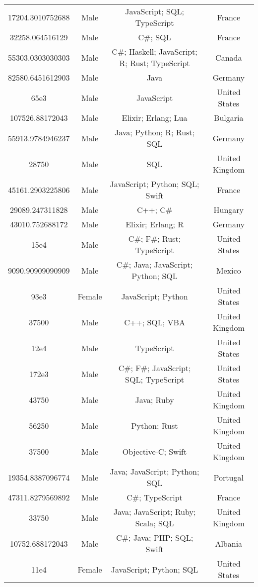 \begin{center}
\begin{tabular}{ |c|c|c|c| }
17204.3010752688  &  Male  &  JavaScript; SQL; TypeScript  &  France  \\ 
32258.064516129  &  Male  &  C\#; SQL  &  France  \\ 
55303.0303030303  &  Male  &  C\#; Haskell; JavaScript; R; Rust; TypeScript  &  Canada  \\ 
82580.6451612903  &  Male  &  Java  &  Germany  \\ 
65e3  &  Male  &  JavaScript  &  United States  \\ 
107526.88172043  &  Male  &  Elixir; Erlang; Lua  &  Bulgaria  \\ 
55913.9784946237  &  Male  &  Java; Python; R; Rust; SQL  &  Germany  \\ 
28750  &  Male  &  SQL  &  United Kingdom  \\ 
45161.2903225806  &  Male  &  JavaScript; Python; SQL; Swift  &  France  \\ 
29089.247311828  &  Male  &  C++; C\#  &  Hungary  \\ 
43010.752688172  &  Male  &  Elixir; Erlang; R  &  Germany  \\ 
15e4  &  Male  &  C\#; F\#; Rust; TypeScript  &  United States  \\ 
9090.90909090909  &  Male  &  C\#; Java; JavaScript; Python; SQL  &  Mexico  \\ 
93e3  &  Female  &  JavaScript; Python  &  United States  \\ 
37500  &  Male  &  C++; SQL; VBA  &  United Kingdom  \\ 
12e4  &  Male  &  TypeScript  &  United States  \\ 
172e3  &  Male  &  C\#; F\#; JavaScript; SQL; TypeScript  &  United States  \\ 
43750  &  Male  &  Java; Ruby  &  United Kingdom  \\ 
56250  &  Male  &  Python; Rust  &  United Kingdom  \\ 
37500  &  Male  &  Objective-C; Swift  &  United Kingdom  \\ 
19354.8387096774  &  Male  &  Java; JavaScript; Python; SQL  &  Portugal  \\ 
47311.8279569892  &  Male  &  C\#; TypeScript  &  France  \\ 
33750  &  Male  &  Java; JavaScript; Ruby; Scala; SQL  &  United Kingdom  \\ 
10752.688172043  &  Male  &  C\#; Java; PHP; SQL; Swift  &  Albania  \\ 
11e4  &  Female  &  JavaScript; Python; SQL  &  United States  \\ 

\end{tabular}
\end{center}

